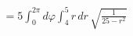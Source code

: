\documentclass[preview]{standalone}
\begin{document}
\begin{align*}
= 5 \int_0^{2\pi} d\varphi \int_4^5 r\,dr\, \sqrt{\frac{1}{25 - r^2}}
\end{align*}
\end{document}
